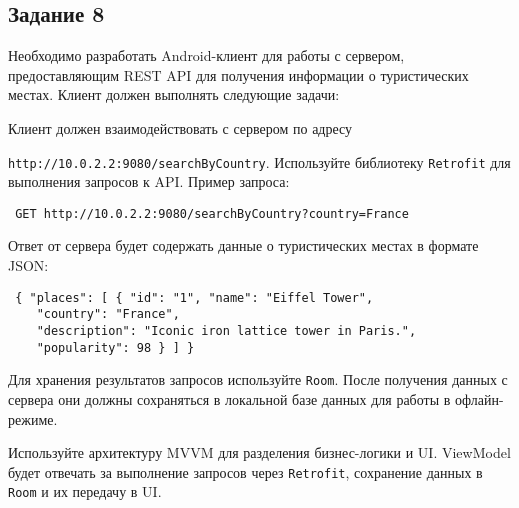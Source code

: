 \documentclass[a4paper,12pt]{article}
\begin{document}
\subsection*{Задание 8}

Необходимо разработать Android-клиент для работы с сервером, предоставляющим REST API для получения информации о туристических местах. Клиент должен выполнять следующие задачи:


Клиент должен взаимодействовать с сервером по адресу 

\texttt{http://10.0.2.2:9080/searchByCountry}. Используйте библиотеку \texttt{Retrofit} для выполнения запросов к API. Пример запроса:

\begin{verbatim} GET http://10.0.2.2:9080/searchByCountry?country=France \end{verbatim}

Ответ от сервера будет содержать данные о туристических местах в формате JSON:

\begin{verbatim} { "places": [ { "id": "1", "name": "Eiffel Tower", 
    "country": "France", 
    "description": "Iconic iron lattice tower in Paris.", 
    "popularity": 98 } ] } \end{verbatim}


Для хранения результатов запросов используйте \texttt{Room}. После получения данных с сервера они должны сохраняться в локальной базе данных для работы в офлайн-режиме.


Используйте архитектуру MVVM для разделения бизнес-логики и UI. ViewModel будет отвечать за выполнение запросов через \texttt{Retrofit}, сохранение данных в \texttt{Room} и их передачу в UI.
\end{document}
